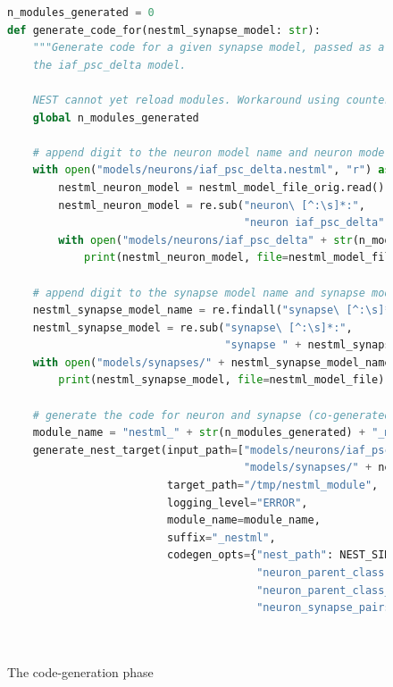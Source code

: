 \begin{figure}[ht!]
\caption{The code-generation phase}
\begin{lstlisting}[language=Python]
n_modules_generated = 0
def generate_code_for(nestml_synapse_model: str):
    """Generate code for a given synapse model, passed as a string, in combination with
    the iaf_psc_delta model.

    NEST cannot yet reload modules. Workaround using counter to generate unique names."""
    global n_modules_generated

    # append digit to the neuron model name and neuron model filename
    with open("models/neurons/iaf_psc_delta.nestml", "r") as nestml_model_file_orig:
        nestml_neuron_model = nestml_model_file_orig.read()
        nestml_neuron_model = re.sub("neuron\ [^:\s]*:",
                                     "neuron iaf_psc_delta" + str(n_modules_generated) + ":", nestml_neuron_model)
        with open("models/neurons/iaf_psc_delta" + str(n_modules_generated) + ".nestml", "w") as nestml_model_file_mod:
            print(nestml_neuron_model, file=nestml_model_file_mod)

    # append digit to the synapse model name and synapse model filename
    nestml_synapse_model_name = re.findall("synapse\ [^:\s]*:", nestml_synapse_model)[0][8:-1]
    nestml_synapse_model = re.sub("synapse\ [^:\s]*:",
                                  "synapse " + nestml_synapse_model_name + str(n_modules_generated) + ":", nestml_synapse_model)
    with open("models/synapses/" + nestml_synapse_model_name + str(n_modules_generated) + ".nestml", "w") as nestml_model_file:
        print(nestml_synapse_model, file=nestml_model_file)

    # generate the code for neuron and synapse (co-generated)
    module_name = "nestml_" + str(n_modules_generated) + "_module"
    generate_nest_target(input_path=["models/neurons/iaf_psc_delta" + str(n_modules_generated) + ".nestml",
                                     "models/synapses/" + nestml_synapse_model_name + str(n_modules_generated) + ".nestml"],
                         target_path="/tmp/nestml_module",
                         logging_level="ERROR",
                         module_name=module_name,
                         suffix="_nestml",
                         codegen_opts={"nest_path": NEST_SIMULATOR_INSTALL_LOCATION,
                                       "neuron_parent_class": "StructuralPlasticityNode",
                                       "neuron_parent_class_include": "structural_plasticity_node.h",
                                       "neuron_synapse_pairs": [{"neuron": "iaf_psc_delta" + str(n_modules_generated),
                                                                   "synapse": nestml_synapse_model_name + str(n_modules_generated),
                                                                   "post_ports": ["post_spikes"]}]})


\end{lstlisting}
\end{figure}
